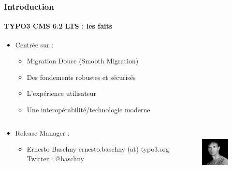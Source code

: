 \begin{frame}[fragile]
	\frametitle{Introduction}
	\framesubtitle{TYPO3 CMS 6.2 LTS : les faits}

	\begin{itemize}
		\item Centrée sur :

			\begin{itemize}
				\item Migration Douce (Smooth Migration)
				\item Des fondements robustes et sécurisés
				\item L'expérience utilisateur
				\item Une interopérabilité/technologie moderne
			\end{itemize}
	\end{itemize}

	\begin{columns}[T]
		\begin{column}{.5\textwidth}
			\begin{itemize}
				\item Release Manager :
				\begin{itemize}
					\item Ernesto Baschny\newline
						ernesto.baschny (at) typo3.org\newline
						Twitter : @baschny
				\end{itemize}
			\end{itemize}
		\end{column}

		\begin{column}{.5\textwidth}
			\begin{figure}
				\includegraphics[width=2.6cm,height=2.6cm]{Images/Introduction/ErnestoBaschny.jpg}
			\end{figure}
		\end{column}

	\end{columns}

\end{frame}



